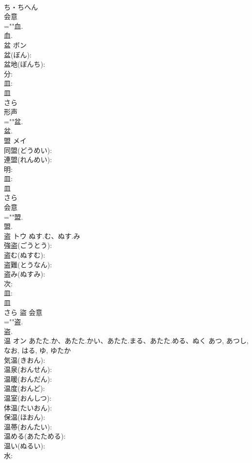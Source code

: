 \documentclass[8pt]{extreport}
\begin{document}
\begin{CJK}{UTF8}{min}
\\	ち・ちへん	
\\	会意 
\\	=""血.
\\	血.
\\	盆	ボン			
\\	盆(ぼん): 
\\	盆地(ぼんち): 
\\	分: 
\\	皿: 
\\	皿	
\\	さら	
\\	形声 
\\	=""盆.
\\	盆.
\\	盟	メイ			
\\	同盟(どうめい): 
\\	連盟(れんめい): 
\\	明: 
\\	皿: 
\\	皿	
\\	さら	
\\	会意 
\\	=""盟.
\\	盟.
\\	盗	トウ	ぬす.む、ぬす.み		
\\	強盗(ごうとう): 
\\	盗む(ぬすむ): 
\\	盗難(とうなん): 
\\	盗み(ぬすみ): 
\\	次: 
\\	皿: 
\\	皿	
\\	さら	盜	会意 
\\	=""盗.
\\	盗.
\\	温	オン	あたた.か、あたた.かい、あたた.まる、あたた.める、ぬく	あつ, あつし, なお, はる, ゆ, ゆたか	
\\	気温(きおん): 
\\	温泉(おんせん): 
\\	温暖(おんだん): 
\\	温度(おんど): 
\\	温室(おんしつ): 
\\	体温(たいおん): 
\\	保温(ほおん): 
\\	温帯(おんたい): 
\\	温める(あたためる): 
\\	温い(ぬるい): 
\\	水: 

\end{CJK}
\end{document}
